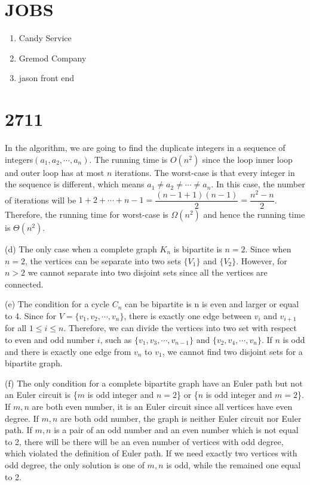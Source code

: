 \documentclass[11pt]{article}
\begin{document}
\section{JOBS}
\begin{enumerate}
    \item Candy Service
    \item Gremod Company
    \item jason front end
\end{enumerate}


\section{2711}
In the algorithm, we are going to find the duplicate integers in a sequence of integers$(a_1, a_2, \cdots , a_n)$. The running time is $O(n^2)$ since the loop inner loop and outer loop has at most $n$ iterations. The worst-case is that every integer in the sequence is different, which means $a_1 \neq a_2 \neq \cdots \neq a_n$. In this case, the number of iterations will be $1+2+ \cdots + n-1 = \dfrac{(n-1+1)(n-1)}{2} = \dfrac{n^2-n}{2}$. Therefore, the running time for worst-case is $\Omega(n^2)$ and hence the running time is $\Theta(n^2)$.
\newpage


(d) The only case when a complete graph $K_n$ is bipartite is $n = 2$. Since when $n = 2$, the vertices can be separate into two sets $\{V_1\}$ and $\{V_2\}$. However, for $n>2$ we cannot separate into two disjoint sets since all the vertices are connected.


(e) The condition for a cycle $C_n$ can be bipartite is n is even and larger or equal to 4. Since for $V = \{v_1, v_2, \cdots, v_n\}$, there is exactly one edge between $v_i$ and $v_{i+1}$ for all $1\leq i \leq n$. Therefore, we can divide the vertices into two set with respect to even and odd number $i$, such as $\{v_1, v_3, \cdots, v_{n-1}\}$ and $\{v_2, v_4, \cdots, v_n\}$. If $n$ is odd and there is exactly one edge from $v_n$ to $v_1$, we cannot find two disjoint sets for a bipartite graph.

(f) The only condition for a complete bipartite graph have an Euler path but not an Euler circuit is \{$m$ is odd integer and $n =2$\} or \{$n$ is odd integer and $m =2$\}. If $m, n$ are both even number, it is an Euler circuit since all vertices have even degree. If $m, n$ are both odd number, the graph is neither Euler circuit nor Euler path. If $m,n$ is a pair of an odd number and an even number which is not equal to 2, there will be there will be an even number of vertices with odd degree, which violated the definition of Euler path. If we need exactly two vertices with odd degree, the only solution is one of $m, n$ is odd, while the remained one equal to 2.
\end{document}
